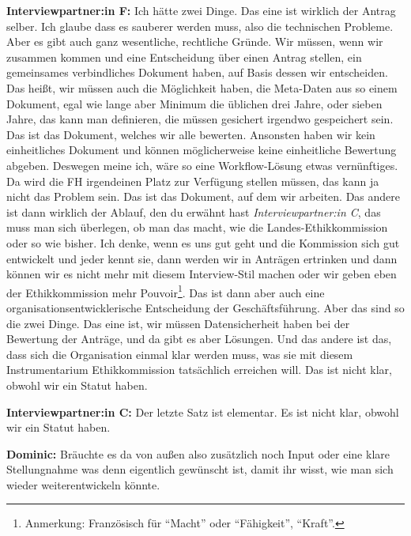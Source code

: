 \documentclass[a4paper,12pt,twoside]{scrreprt}
\begin{document}
\textbf{Interviewpartner:in F:} Ich hätte zwei Dinge. Das eine ist wirklich der Antrag selber. Ich glaube dass es sauberer werden muss, also die technischen Probleme. Aber es gibt auch ganz wesentliche, rechtliche Gründe. Wir müssen, wenn wir zusammen kommen und eine Entscheidung über einen Antrag stellen, ein gemeinsames verbindliches Dokument haben, auf Basis dessen wir entscheiden. Das heißt, wir müssen auch die Möglichkeit haben, die Meta-Daten aus so einem Dokument, egal wie lange aber Minimum die üblichen drei Jahre, oder sieben Jahre, das kann man definieren, die müssen gesichert irgendwo gespeichert sein. Das ist das Dokument, welches wir alle bewerten. Ansonsten haben wir kein einheitliches Dokument und können möglicherweise keine einheitliche Bewertung abgeben. Deswegen meine ich, wäre so eine Workflow-Lösung etwas vernünftiges. Da wird die FH irgendeinen Platz zur Verfügung stellen müssen, das kann ja nicht das Problem sein. Das ist das Dokument, auf dem wir arbeiten. Das andere ist dann wirklich der Ablauf, den du erwähnt hast \textit{Interviewpartner:in C}, das muss man sich überlegen, ob man das macht, wie die Landes-Ethikkommission oder so wie bisher. Ich denke, wenn es uns gut geht und die Kommission sich gut entwickelt und jeder kennt sie, dann werden wir in Anträgen ertrinken und dann können wir es nicht mehr mit diesem Interview-Stil machen oder wir geben eben der Ethikkommission mehr Pouvoir\footnote{Anmerkung: Französisch für \enquote{Macht} oder \enquote{Fähigkeit}, \enquote{Kraft}.}. Das ist dann aber auch eine organisationsentwicklerische Entscheidung der Geschäftsführung. Aber das sind so die zwei Dinge. Das eine ist, wir müssen Datensicherheit haben bei der Bewertung der Anträge, und da gibt es aber Lösungen. Und das andere ist das, dass sich die Organisation einmal klar werden muss, was sie mit diesem Instrumentarium Ethikkommission tatsächlich erreichen will. Das ist nicht klar, obwohl wir ein Statut haben.

\textbf{Interviewpartner:in C:} Der letzte Satz ist elementar. Es ist nicht klar, obwohl wir ein Statut haben.

\textbf{Dominic:} Bräuchte es da von außen also zusätzlich noch Input oder eine klare Stellungnahme was denn eigentlich gewünscht ist, damit ihr wisst, wie man sich wieder weiterentwickeln könnte.
\end{document}
